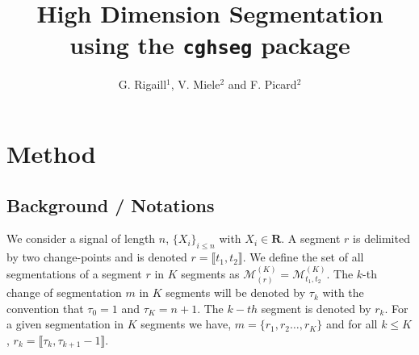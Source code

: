 \documentclass[article,10pt]{llncs}
\begin{document}
\title{High Dimension Segmentation using the \texttt{cghseg} package}
%
%
\author{G. Rigaill$^1$, V. Miele$^2$ and F. Picard$^2$}
%
%
%

\maketitle   

\begin{abstract}
\keywords{}
\end{abstract}
\section{Method}

\subsection{Background / Notations}
We consider a signal of length $n$, $\{X_i\}_{i \leq n}$ with $X_i \in \mathbf{R}$.
A segment $r$ is delimited by two change-points and is denoted
 $r = \llbracket t_1, t_2 \rrbracket$.
We define the set of all segmentations of a segment $r$ in $K$ segments as $\mathcal{M}^{(K)}_{(r)} = \mathcal{M}^{(K)}_{t_1, t_2}$.
The $k$-th change of segmentation $m$ in $K$ segments will be denoted by $\tau_k$ with the convention that $\tau_0 = 1$ and $\tau_K = n+1$.
The $k-th$ segment is denoted by $r_k$.
For a given segmentation in $K$ segments we have, $m = \{r_1, r_2 \ldots, r_K\}$ and for all $k \leq K$,  $r_k = \llbracket \tau_k, \tau_{k+1} -1\rrbracket$.
\end{document}
